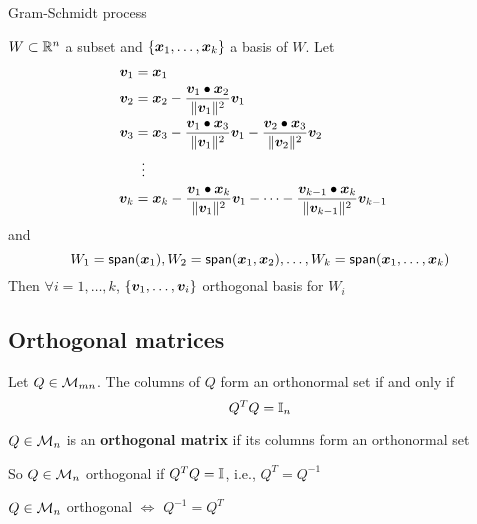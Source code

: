 \documentclass[aspectratio=169]{beamer}\usepackage[]{graphicx}\usepackage[]{xcolor}
\begin{document}
	\begin{frame}{Gram-Schmidt process}
	\begin{theorem}
	$W\subset\mathbb{R}^n$ a subset and $\{\bm{x}_1,\ldots,\bm{x}_k\}$ a basis of $W$. Let
	\begin{align*}
	\bm{v}_1 &= \bm{x}_1 \\
	\bm{v}_2 &= \bm{x}_2 -\frac{\bm{v}_1\bullet\bm{x}_2}{\|\bm{v}_1\|^2}\bm{v}_1 \\
	\bm{v}_3 &= \bm{x}_3 -\frac{\bm{v}_1\bullet\bm{x}_3}{\|\bm{v}_1\|^2}\bm{v}_1 -\frac{\bm{v}_2\bullet\bm{x}_3}{\|\bm{v}_2\|^2}\bm{v}_2 \\
	&\;\;\vdots & \\
	\bm{v}_k &= \bm{x}_k -\frac{\bm{v}_1\bullet\bm{x}_k}{\|\bm{v}_1\|^2}\bm{v}_1 -\cdots-\frac{\bm{v}_{k-1}\bullet\bm{x}_k}{\|\bm{v}_{k-1}\|^2}\bm{v}_{k-1}
	\end{align*}
	and
	\[
	W_1=\mathsf{span}(\bm{x}_1),W_2 = \mathsf{span}(\bm{x}_1,\bm{x}_2),\ldots,
	W_k = \mathsf{span}(\bm{x}_1,\ldots,\bm{x}_k)
	\]
	Then $\forall i=1,\ldots,k$, $\{\bm{v}_1,\ldots,\bm{v}_i\}$ orthogonal basis for $W_i$
	\end{theorem}
	\end{frame}
	
	


\subsection{Orthogonal matrices}

\begin{frame}
\begin{theorem}
Let $Q\in\mathcal{M}_{mn}$. The columns of $Q$ form an orthonormal set if and only if
\[
Q^TQ=\mathbb{I}_n
\]
\end{theorem}
\begin{definition}
$Q\in\mathcal{M}_n$ is an \textbf{orthogonal matrix} if its columns form an orthonormal set 
\end{definition}
So $Q\in\mathcal{M}_n$ orthogonal if $Q^TQ=\mathbb{I}$, i.e., $Q^T=Q^{-1}$
\begin{theorem}
$Q\in\mathcal{M}_n$ orthogonal $\iff$ $Q^{-1} = Q^T$
\end{theorem}
\end{frame}
\end{document}
